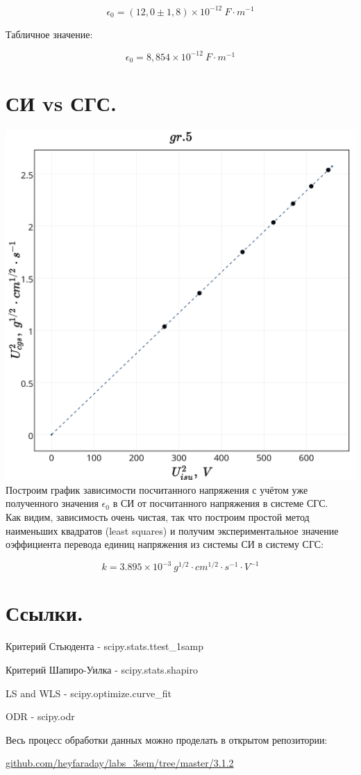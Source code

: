 $$\boxed{\epsilon_0 = (12,0 \pm 1,8) \times 10^{-12} \ F \cdot m^{-1}}$$

Табличное значение:

$$\epsilon_0 = 8,854 \times 10^{-12} \ F\cdot m^{-1} $$


\section{\label{sec:level1}СИ vs СГС.}
\includegraphics[scale = 0.20]{my_plot5.png}\\

Построим график зависимости посчитанного напряжения с учётом уже полученного значения $\epsilon_0$ в СИ от посчитанного напряжения в системе СГС. \\



Как видим, зависимость очень чистая, так что построим простой метод наименьших квадратов (least squares) и получим экспериментальное значение оэффициента перевода единиц напряжения из системы СИ в систему СГС:

$$\boxed{k = 3.895 \times 10^{-3} \ g^{1/2} \cdot cm^{1/2} \cdot s^{-1} \cdot V^{-1}}$$

\section{\label{sec:level1}Ссылки.}

Критерий Стьюдента - scipy.stats.ttest\_1samp

Критерий Шапиро-Уилка - scipy.stats.shapiro

LS and WLS - scipy.optimize.curve\_fit

ODR - scipy.odr

Весь процесс обработки данных можно проделать в открытом репозитории:

\href{github.com/heyfaraday/labs_3sem/tree/master/3.1.2}{github.com/heyfaraday/labs\_3sem/tree/master/3.1.2}

